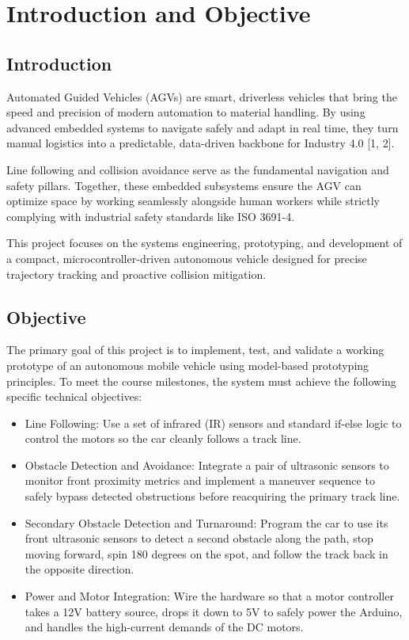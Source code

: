 \section{Introduction and Objective}
\label{sec:introduction and objective}
\subsection{Introduction}

Automated Guided Vehicles (AGVs) are smart, driverless vehicles that bring the speed and precision of modern automation to material handling. By using advanced embedded systems to navigate safely and adapt in real time, they turn manual logistics into a predictable, data-driven backbone for Industry 4.0 [1, 2]. 

Line following and collision avoidance serve as the fundamental navigation and safety pillars. Together, these embedded subsystems ensure the AGV can optimize space by working seamlessly alongside human workers while strictly complying with industrial safety standards like ISO 3691-4. 

This project focuses on the systems engineering, prototyping, and development of a compact, microcontroller-driven autonomous vehicle designed for precise trajectory tracking and proactive collision mitigation. 

\subsection{Objective}

The primary goal of this project is to implement, test, and validate a working prototype of an autonomous mobile vehicle using model-based prototyping principles. To meet the course milestones, the system must achieve the following specific technical objectives:
\begin{itemize}
    \item {Line Following:} Use a set of infrared (IR) sensors and standard if-else logic to control the motors so the car cleanly follows a track line.
    \item {Obstacle Detection and Avoidance:} Integrate a pair of ultrasonic sensors to monitor front proximity metrics and implement a maneuver sequence to safely bypass detected obstructions before reacquiring the primary track line.
    \item {Secondary Obstacle Detection and Turnaround:} Program the car to use its front ultrasonic sensors to detect a second obstacle along the path, stop moving forward, spin 180 degrees on the spot, and follow the track back in the opposite direction.
    \item {Power and Motor Integration:} Wire the hardware so that a motor controller takes a 12V battery source, drops it down to 5V to safely power the Arduino, and handles the high-current demands of the DC motors.
\end{itemize}

